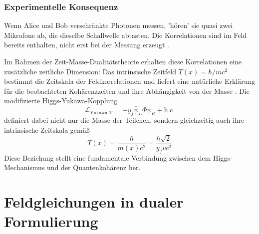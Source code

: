 \documentclass[12pt,a4paper]{article}
\newcommand{\Tfield}{T(x)}
\begin{document}
	\subsubsection{Experimentelle Konsequenz}
	Wenn Alice und Bob verschränkte Photonen messen, 'hören' sie quasi zwei Mikrofone ab, die dieselbe Schallwelle abtasten. Die Korrelationen sind im Feld bereits enthalten, nicht erst bei der Messung erzeugt \cite{Zeilinger2010}.
	
	Im Rahmen der Zeit-Masse-Dualitätstheorie erhalten diese Korrelationen eine zusätzliche zeitliche Dimension: Das intrinsische Zeitfeld \(\Tfield = \hbar/mc^2\) bestimmt die Zeitskala der Feldkorrelationen und liefert eine natürliche Erklärung für die beobachteten Kohärenzzeiten und ihre Abhängigkeit von der Masse \cite{Pascher2024}. Die modifizierte Higgs-Yukawa-Kopplung
	\begin{equation}
		\mathcal{L}_{\text{Yukawa-T}} = -y_f \bar{\psi}_L \Phi \psi_R + \text{h.c.}
	\end{equation}
	definiert dabei nicht nur die Masse der Teilchen, sondern gleichzeitig auch ihre intrinsische Zeitskala gemäß
	\begin{equation}
		\Tfield = \frac{\hbar}{m(x) c^2} = \frac{\hbar \sqrt{2}}{y_f v c^2}
	\end{equation}
	Diese Beziehung stellt eine fundamentale Verbindung zwischen dem Higgs-Mechanismus und der Quantenkohärenz her.
	
	\section{Feldgleichungen in dualer Formulierung}
\end{document}
